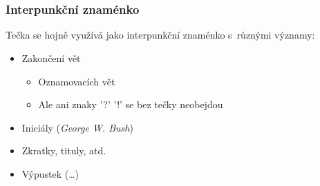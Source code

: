 \documentclass{beamer}
\begin{document}
    \section[Interpunkce]{}
    \begin{frame}
        \frametitle{Interpunkční znaménko}
        Tečka se hojně využívá jako interpunkční znaménko s~různými významy:\\
        \vspace{3mm}
        \begin{itemize}
            \item<2-> Zakončení vět
            \begin{itemize}
                \item<3-> Oznamovacích vět
                \item<4-> Ale ani znaky '?' '!' se bez tečky neobejdou \Smiley{}
            \end{itemize}
            \item<5-> Iniciály ({\em George W. Bush})
            \item<6-> Zkratky, tituly, atd.
            \item<7-> Výpustek (\dots)
        \end{itemize}
    \end{frame}
\end{document}
